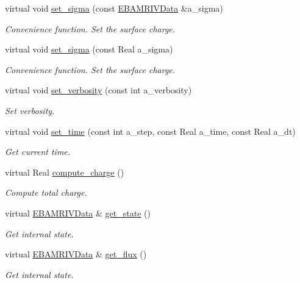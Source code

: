 \begin{DoxyCompactItemize}
virtual void \hyperlink{classsigma__solver_aa5a5ea077a9e05c3aa973df6efcd6a7f}{set\+\_\+sigma} (const \hyperlink{type__definitions_8H_a6b8fa905d55cbb491b52180386f0e0c1}{E\+B\+A\+M\+R\+I\+V\+Data} \&a\+\_\+sigma)
\begin{DoxyCompactList}\small\item\em Convenience function. Set the surface charge. \end{DoxyCompactList}\item 
virtual void \hyperlink{classsigma__solver_aa1db8e6c7444665c9b4b0a0400b3150e}{set\+\_\+sigma} (const Real a\+\_\+sigma)
\begin{DoxyCompactList}\small\item\em Convenience function. Set the surface charge. \end{DoxyCompactList}\item 
virtual void \hyperlink{classsigma__solver_a0525d43939079f31f31255a32c59cdf8}{set\+\_\+verbosity} (const int a\+\_\+verbosity)
\begin{DoxyCompactList}\small\item\em Set verbosity. \end{DoxyCompactList}\item 
virtual void \hyperlink{classsigma__solver_a7cfc1704ce28e86b81c088ee5ee89155}{set\+\_\+time} (const int a\+\_\+step, const Real a\+\_\+time, const Real a\+\_\+dt)
\begin{DoxyCompactList}\small\item\em Get current time. \end{DoxyCompactList}\item 
virtual Real \hyperlink{classsigma__solver_a47e01b8014f401fc89a481039903dfa6}{compute\+\_\+charge} ()
\begin{DoxyCompactList}\small\item\em Compute total charge. \end{DoxyCompactList}\item 
virtual \hyperlink{type__definitions_8H_a6b8fa905d55cbb491b52180386f0e0c1}{E\+B\+A\+M\+R\+I\+V\+Data} \& \hyperlink{classsigma__solver_af00fef83b59561254f66666ed03e9670}{get\+\_\+state} ()
\begin{DoxyCompactList}\small\item\em Get internal state. \end{DoxyCompactList}\item 
virtual \hyperlink{type__definitions_8H_a6b8fa905d55cbb491b52180386f0e0c1}{E\+B\+A\+M\+R\+I\+V\+Data} \& \hyperlink{classsigma__solver_ab929210067eeedbf9bdd7a0ea23dd7ea}{get\+\_\+flux} ()
\begin{DoxyCompactList}\small\item\em Get internal state. \end{DoxyCompactList}\end{DoxyCompactItemize}
